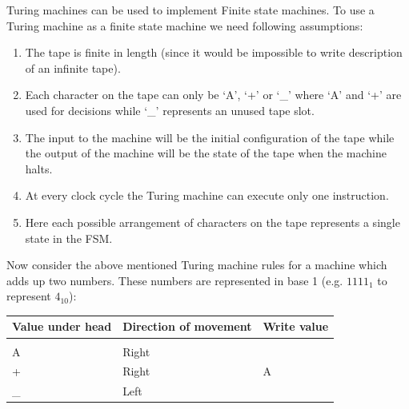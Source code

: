 \documentclass[a4paper,10pt]{article}
\theoremstyle{mytheor}
\begin{document}
{  Turing machines can be used to implement Finite state machines. To use
  a Turing machine as a finite state machine we need following
  assumptions:
  \begin{enumerate}
  \item The tape is finite in length (since it would be impossible
    to write description of an infinite tape).
  \item Each character on the tape can only be `A', `+' or `\_' where
    `A' and `+' are used for decisions while `\_' represents an unused
    tape slot.
  \item The input to the machine will be the initial configuration
    of the tape while the output of the machine will be the state of
    the tape when the machine halts.
  \item At every clock cycle the Turing machine can execute only one
    instruction.
  \item Here each possible arrangement of characters on the tape
    represents a single state in the FSM.
  \end{enumerate}

    Now consider the above mentioned Turing machine rules for a
    machine which adds up two numbers. These numbers are represented
    in base 1 (e.g. $1111_1$ to represent $4_{10}$):
    \begin{table}
      \centering
      \renewcommand{\arraystretch}{1.1}
      \begin{tabularx}{0.8\textwidth}{|X|X|X|}
        \hline
        \rowcolor{greatblue}
        \color{white} Value under head & \color{white}Direction of movement & \color{white}Write value \\
        \hline
        \vspace{0.2cm}&&\\
        A  & Right &   \\
        +  & Right & A \\
        \_ & Left  &   \\
        \hline
      \end{tabularx}
    \end{table}

}
\end{document}
